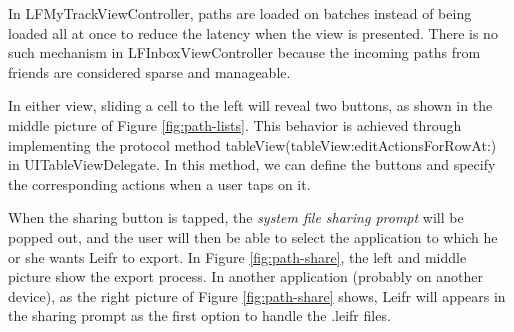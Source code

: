 \documentclass[12pt,a4paper]{article}
\renewcommand\texttt[1]{{\ttfamily\color{textttColor}#1}}
\begin{document}
            In \texttt{LFMyTrackViewController}, paths are loaded on batches instead of being loaded all at once to reduce the latency when the view is presented. There is no such mechanism in \texttt{LFInboxViewController} because the incoming paths from friends are considered sparse and manageable.
            
            In either view, sliding a cell to the left will reveal two buttons, as shown in the middle picture of Figure \ref{fig:path-lists}. This behavior is achieved through implementing the protocol method \texttt{tableView(tableView:editActionsForRowAt:)} in  \texttt{UITableViewDelegate}. In this method, we can define the buttons and specify the corresponding actions when a user taps on it.
            
            When the sharing button is tapped, the \textit{system file sharing prompt} will be popped out, and the user will then be able to select the application to which he or she wants Leifr to export. In Figure \ref{fig:path-share}, the left and middle picture show the export process. In another application (probably on another device), as the right picture of Figure \ref{fig:path-share} shows, Leifr will appears in the sharing prompt as the first option to handle the \texttt{.leifr} files.
            
\end{document}
